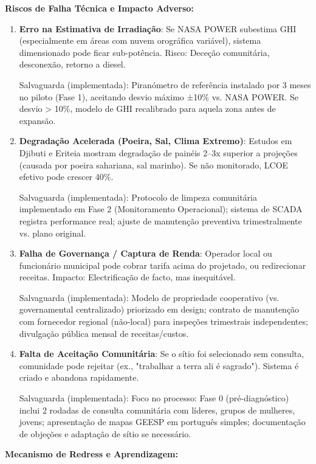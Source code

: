\documentclass[12pt, a4paper]{article}
\begin{document}
\textbf{Riscos de Falha Técnica e Impacto Adverso:}

\begin{enumerate}
\item \textbf{Erro na Estimativa de Irradiação}: Se NASA POWER subestima GHI (especialmente em áreas com nuvem orográfica variável), sistema dimensionado pode ficar sub-potência. Risco: Deceção comunitária, desconexão, retorno a diesel.
  
  Salvaguarda (implementada): Piranómetro de referência instalado por 3 meses no piloto (Fase 1), aceitando desvio máximo ±10\% vs. NASA POWER. Se desvio > 10\%, modelo de GHI recalibrado para aquela zona antes de expansão.

\item \textbf{Degradação Acelerada (Poeira, Sal, Clima Extremo)}: Estudos em Djibuti e Eriteia mostram degradação de painéis 2--3x superior a projeções (causada por poeira sahariana, sal marinho). Se não monitorado, LCOE efetivo pode crescer 40\%.
  
  Salvaguarda (implementada): Protocolo de limpeza comunitária implementado em Fase 2 (Monitoramento Operacional); sistema de SCADA registra performance real; ajuste de manutenção preventiva trimestralmente vs. plano original.

\item \textbf{Falha de Governança / Captura de Renda}: Operador local ou funcionário municipal pode cobrar tarifa acima do projetado, ou redirecionar receitas. Impacto: Electrificação de facto, mas inequitável.
  
  Salvaguarda (implementada): Modelo de propriedade cooperativo (vs. governamental centralizado) priorizado em design; contrato de manutenção com fornecedor regional (não-local) para inspeções trimestrais independentes; divulgação pública mensal de receitas/custos.

\item \textbf{Falta de Aceitação Comunitária}: Se o sítio foi selecionado sem consulta, comunidade pode rejeitar (ex., "trabalhar a terra ali é sagrado"). Sistema é criado e abandona rapidamente.
  
  Salvaguarda (implementada): Foco no processo: Fase 0 (pré-diagnóstico) inclui 2 rodadas de consulta comunitária com líderes, grupos de mulheres, jovens; apresentação de mapas GEESP em português simples; documentação de objeções e adaptação de sítio se necessário.
\end{enumerate}

\textbf{Mecanismo de Redress e Aprendizagem:}
\end{document}
